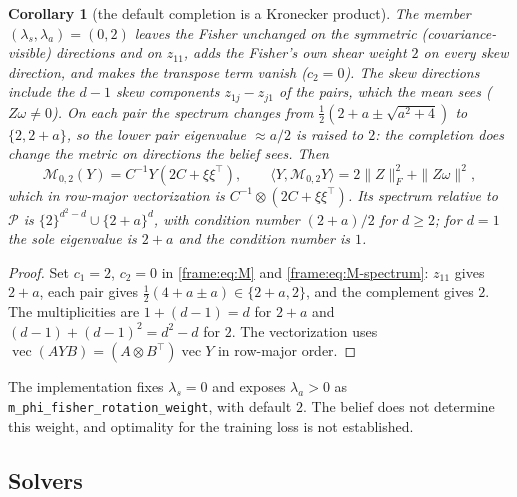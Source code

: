 \documentclass[11pt]{article}
\newtheorem{corollary}[theorem]{Corollary}
\theoremstyle{definition}
\theoremstyle{remark}
\providecommand{\vect}{\operatorname{vec}}
\providecommand{\ip}[2]{\langle #1, #2\rangle}
\begin{document}
\begin{corollary}[the default completion is a Kronecker product]\label{frame:cor:kron}
The member $(\lambda_s,\lambda_a)=(0,2)$ leaves the Fisher unchanged on the symmetric (covariance-visible) directions and on $z_{11}$, adds the Fisher's own shear weight $2$ on every skew direction, and makes the transpose term vanish ($c_2=0$). The skew directions include the $d-1$ skew components $z_{1j}-z_{j1}$ of the pairs, which the mean sees ($Z\omega\neq0$). On each pair the spectrum changes from $\frac12(2+a\pm\sqrt{a^2+4})$ to $\{2,2+a\}$, so the lower pair eigenvalue $\approx a/2$ is raised to $2$: the completion does change the metric on directions the belief sees. Then
\begin{equation}\label{frame:eq:kron}
\mathcal{M}_{0,2}(Y)=C^{-1}Y(2C+\xi\xi^\top),\qquad \ip{Y}{\mathcal{M}_{0,2}Y}=2\|Z\|_F^2+\|Z\omega\|^2,
\end{equation}
which in row-major vectorization is $C^{-1}\otimes(2C+\xi\xi^\top)$. Its spectrum relative to $\mathcal{P}$ is $\{2\}^{d^2-d}\cup\{2+a\}^{d}$, with condition number $(2+a)/2$ for $d\ge2$; for $d=1$ the sole eigenvalue is $2+a$ and the condition number is $1$.
\end{corollary}
\begin{proof}
Set $c_1=2$, $c_2=0$ in \eqref{frame:eq:M} and \eqref{frame:eq:M-spectrum}: $z_{11}$ gives $2+a$, each pair gives $\frac12(4+a\pm a)\in\{2+a,2\}$, and the complement gives $2$. The multiplicities are $1+(d-1)=d$ for $2+a$ and $(d-1)+(d-1)^2=d^2-d$ for $2$. The vectorization uses $\vect(AYB)=(A\otimes B^\top)\vect Y$ in row-major order.
\end{proof}

The implementation fixes $\lambda_s=0$ and exposes $\lambda_a>0$ as \texttt{m\_phi\_fisher\_rotation\_weight}, with default $2$. The belief does not determine this weight, and optimality for the training loss is not established.

\subsection{Solvers}\label{frame:sec:solvers}
\end{document}
